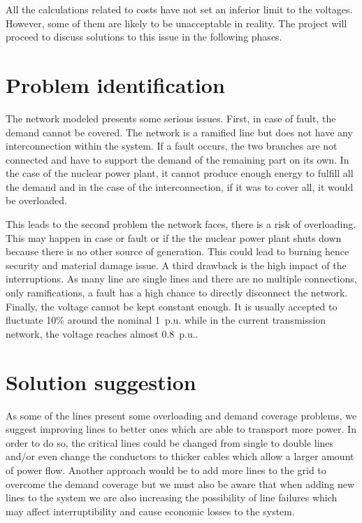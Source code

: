All the calculations related to costs have not set an inferior limit to the voltages. However, some of them are likely to be unacceptable in reality. The project will proceed to discuss solutions to this issue in the following phases. 

\section{Problem identification}
The network modeled presents some serious issues. First, in case of fault, the demand cannot be covered. The network is a ramified line but does not have any interconnection within the system. If a fault occurs, the two branches are not connected and have to support the demand of the remaining part on its own. In the case of the nuclear power plant, it cannot produce enough energy to fulfill all the demand and in the case of the interconnection, if it was to cover all, it would be overloaded. 

This leads to the second problem the network faces, there is a risk of overloading. This may happen in case or fault or if the the nuclear power plant shuts down because there is no other source of generation. This could lead to burning hence security and material damage issue. A third drawback is the high impact of the interruptions. As many line are single lines and there are no multiple connections, only ramifications, a fault has a high chance to directly disconnect the network. Finally, the voltage cannot be kept constant enough. It is usually accepted to fluctuate 10\% around the nominal 1~p.u. while in the current transmission network, the voltage reaches almost 0.8~p.u..

\section{Solution suggestion}
As some of the lines present some overloading and demand coverage problems, we suggest improving lines to better ones which are able to transport more power. In order to do so, the critical lines could be changed from single to double lines and/or even change the conductors to thicker cables which allow a larger amount of power flow. Another approach would be to add more lines to the grid to overcome the demand coverage but we must also be aware that when adding new lines to the system we are also increasing the possibility of line failures which may affect interruptibility and cause economic losses to the system.

